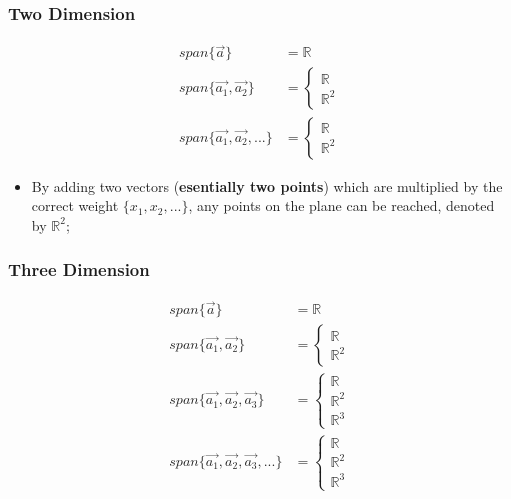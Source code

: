   \subsubsection{Two Dimension}
  
  \begin{align}
    span \{ \vec{a} \} &= \mathbb{R} \\ 
    span \{ \vec{a_{1}}, \vec{a_{2}} \} &= 
    \begin{cases}
      \mathbb{R} \\ 
      \mathbb{R}^{2}
    \end{cases}
    \\
    span \{ \vec{a_{1}}, \vec{a_{2}}, ... \} &= 
    \begin{cases}
      \mathbb{R} \\ 
      \mathbb{R}^{2}
    \end{cases}
  \end{align}
  \begin{itemize}
    \item By adding two vectors (\textbf{esentially two points}) which are multiplied by the 
    correct weight $ \{ x_{1}, x_{2}, ... \} $, any points
    on the plane can be reached, denoted by $ \mathbb{R}^{2} $;
  \end{itemize}
  \subsubsection{Three Dimension}
  
  \begin{align}
    span \{ \vec{a} \} &= \mathbb{R} \\ 
    span \{ \vec{a_{1}}, \vec{a_{2}} \} &= 
    \begin{cases}
      \mathbb{R} \\ 
      \mathbb{R}^{2}
    \end{cases}
    \\
    span \{ \vec{a_{1}}, \vec{a_{2}}, \vec{a_{3}} \} &= 
    \begin{cases}
      \mathbb{R} \\ 
      \mathbb{R}^{2} \\ 
      \mathbb{R}^{3}
    \end{cases}
    \\
    span \{ \vec{a_{1}}, \vec{a_{2}}, \vec{a_{3}}, ... \} &= 
    \begin{cases}
      \mathbb{R} \\ 
      \mathbb{R}^{2} \\ 
      \mathbb{R}^{3}
    \end{cases}
  \end{align}